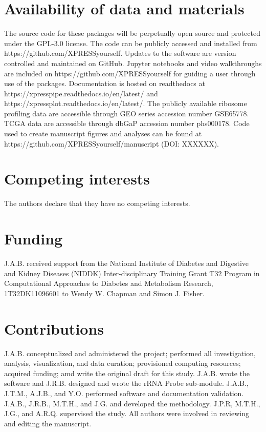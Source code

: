 \documentclass[11pt, a4paper, oneside]{article}
\begin{document}
\section*{Availability of data and materials}
The source code for these packages will be perpetually open source and protected under the GPL-3.0 license. The code can be publicly accessed and installed from https://github.com/XPRESSyourself. Updates to the software are version controlled and maintained on GitHub. Jupyter notebooks and video walkthroughs are included on https://github.com/XPRESSyourself for guiding a user through use of the packages. Documentation is hosted on readthedocs \cite{readthedocs} at https://xpresspipe.readthedocs.io/en/latest/ and https://xpressplot.readthedocs.io/en/latest/. The publicly available ribosome profiling data are accessible through GEO series accession number GSE65778. TCGA data are accessible through dbGaP accession number phs000178. Code used to create manuscript figures and analyses can be found at https://github.com/XPRESSyourself/manuscript (DOI: XXXXXX).

\section*{Competing interests}
The authors declare that they have no competing interests.

\section*{Funding}
J.A.B. received support from the National Institute of Diabetes and Digestive and Kidney Diseases (NIDDK) Inter-disciplinary Training Grant T32 Program in Computational Approaches to Diabetes and Metabolism Research, 1T32DK11096601 to Wendy W. Chapman and Simon J. Fisher.

\section*{Contributions}
J.A.B. conceptualized and administered the project; performed all investigation, analysis, visualization, and data curation; provisioned computing resources; acquired funding; amd write the original draft for this study. J.A.B. wrote the software and J.R.B. designed and wrote the rRNA Probe sub-module. J.A.B., J.T.M., A.J.B., and Y.O. performed software and documentation validation. J.A.B., J.R.B., M.T.H., and J.G. and developed the methodology. J.P.R, M.T.H., J.G., and A.R.Q. supervised the study. All authors were involved in reviewing and editing the manuscript.
\end{document}
